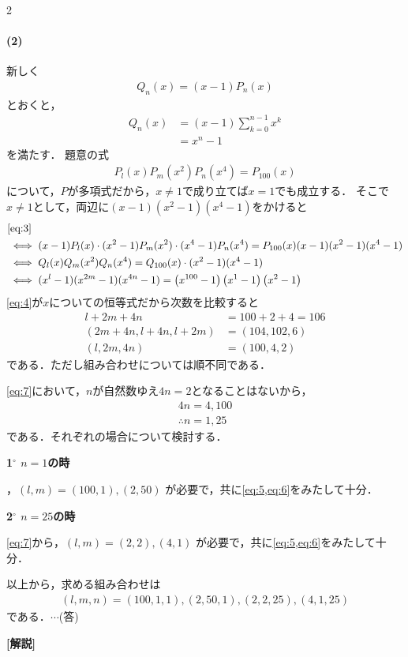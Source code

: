 \documentclass[../../main.tex]{subfiles}
\begin{document}
\begin{multicols}{2}
  \paragraph{(2)}
  新しく
  \begin{align}
    Q_n(x) = (x-1)P_n(x)
  \end{align}
  とおくと，
  \begin{align}
    Q_n(x)
    & = (x-1)\sum_{k=0}^{n-1}x^k \\
    & = x^n-1
  \end{align}
  を満たす．
  題意の式
  \begin{align}
    P_l(x) P_m(x^2) P_n(x^4) = P_{100}(x) \label{eq:3}
  \end{align}
  について，$P$が多項式だから，$x\neq 1$で成り立てば$x=1$でも成立する．
  そこで$x \neq 1$として，両辺に$(x-1)(x^2-1)(x^4-1)$をかけると
  \begin{align}
    & \text{\cref{eq:3}}                                                                                             \\
    & \iff (x-1)P_l(x) \cdot (x^{2}-1)P_m(x^{2}) \cdot (x^{4}-1)P_n(x^{4}) = P_{100}(x)(x-1)(x^2-1)(x^4-1)                  \\
    & \iff Q_l(x) Q_m(x^{2}) Q_n(x^{4}) = Q_{100}(x) \cdot (x^{2}-1) (x^{4}-1)                                              \\
    & \iff (x^l-1) (x^{2m}-1) (x^{4n}-1) = \left(x^{100}-1\right) \left(x^1-1\right) \left(x^2-1\right) \label{eq:4}
  \end{align}
  \cref{eq:4}が$x$についての恒等式だから次数を比較すると
  \begin{align}
    l+2m+4n           & = 100+2+4 = 106 \label{eq:5} \\
    (2m+4n,l+4n,l+2m) & = (104,102,6)   \label{eq:6} \\
    (l,2m,4n)         & = (100,4,2) \label{eq:7}
  \end{align}
  である．ただし組み合わせについては順不同である．

  \cref{eq:7}において，$n$が自然数ゆえ$4n=2$となることはないから，
  \begin{align}
    4n = 4,  100 \\
    \therefore
    n = 1, 25
  \end{align}
  である．それぞれの場合について検討する．

  \textbf{1$^\circ$ $n=1$の時}

  ，$(l,m) = (100,1), (2,50)$ が必要で，共に\cref{eq:5,eq:6}をみたして十分．

  \textbf{2$^\circ$ $n=25$の時}

  \cref{eq:7}から，$(l,m) = (2,2), (4,1)$ が必要で，共に\cref{eq:5,eq:6}をみたして十分．

  以上から，求める組み合わせは
  \begin{align}
    (l,m,n) = (100,1,1), (2,50,1), (2,2,25), (4,1,25)
  \end{align}
  である．$\cdots$(答)

  {\bf [解説]}

  \newpage
\end{multicols}
\end{document}

